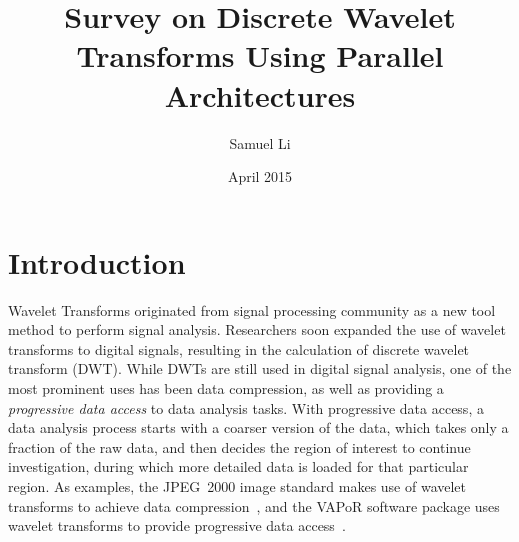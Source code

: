 \documentclass{article}
\title{Survey on Discrete Wavelet Transforms Using Parallel Architectures}
\author{Samuel Li}
\date{April 2015}
\begin{document}
\onehalfspacing

\maketitle

%
%
%
%
%
%

\section{Introduction}
%
Wavelet Transforms originated from signal processing community as a new 
tool method to perform signal analysis.
%
Researchers soon expanded the use of wavelet transforms to digital signals,
resulting in the calculation of discrete wavelet transform (DWT).
%
While DWTs are still used in digital signal analysis, one of the most 
prominent uses has been data compression, as well as providing a
\textit{progressive data access} to data analysis tasks.
%
With progressive data access, a data analysis process starts with a coarser
version of the data, which takes only a fraction of the raw data, 
and then decides the region of interest to continue investigation, during
which more detailed data is loaded for that particular region.
%
As examples, the JPEG~2000 image standard makes use of wavelet
transforms to achieve data compression~\cite{skodras2001jpeg},
and the VAPoR software package uses wavelet transforms to provide
progressive data access~\cite{clyne2003multiresolution}.
\end{document}
